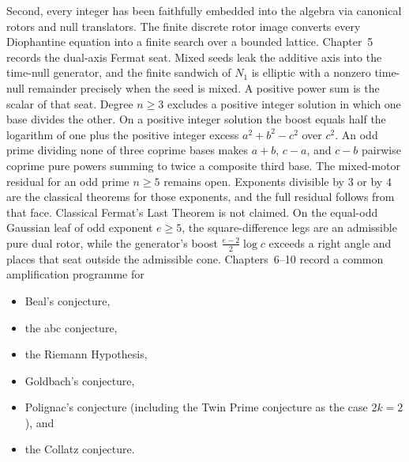 \documentclass[a4paper]{article}
\theoremstyle{definition}
\theoremstyle{remark}
\begin{document}
Second, every integer has been faithfully embedded into the algebra via canonical rotors and null translators. The finite discrete rotor image converts every Diophantine equation into a finite search over a bounded lattice. Chapter~5 records the dual-axis Fermat seat. Mixed seeds leak the additive axis into the time-null generator, and the finite sandwich of \(N_1\) is elliptic with a nonzero time-null remainder precisely when the seed is mixed. A positive power sum is the scalar of that seat. Degree \(n\ge 3\) excludes a positive integer solution in which one base divides the other. On a positive integer solution the boost equals half the logarithm of one plus the positive integer excess \(a^2+b^2-c^2\) over \(c^2\). An odd prime dividing none of three coprime bases makes \(a+b\), \(c-a\), and \(c-b\) pairwise coprime pure powers summing to twice a composite third base. The mixed-motor residual for an odd prime \(n\ge 5\) remains open. Exponents divisible by \(3\) or by \(4\) are the classical theorems for those exponents, and the full residual follows from that face. Classical Fermat’s Last Theorem is not claimed. On the equal-odd Gaussian leaf of odd exponent \(e\ge 5\), the square-difference legs are an admissible pure dual rotor, while the generator's boost \(\frac{e-2}{2}\log c\) exceeds a right angle and places that seat outside the admissible cone. Chapters~6--10 record a common amplification programme for
\begin{itemize}
  \item Beal’s conjecture,
  \item the abc conjecture,
  \item the Riemann Hypothesis,
  \item Goldbach’s conjecture,
  \item Polignac’s conjecture (including the Twin Prime conjecture as the case \( 2k = 2 \)), and
  \item the Collatz conjecture.
\end{itemize}
\end{document}
